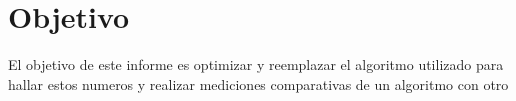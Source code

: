 \section{Objetivo}
El objetivo de este informe es optimizar y reemplazar el algoritmo utilizado para hallar estos numeros y realizar mediciones comparativas
de un algoritmo con otro